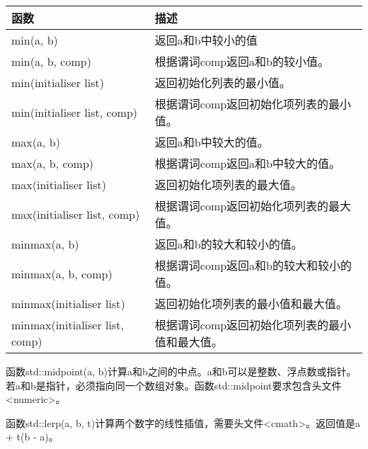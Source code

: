 \begin{longtable}[c]{|l|l|}
\hline
\textbf{函数}           & \textbf{描述}                                                                \\ \hline
\endfirsthead
%
\endhead
%
min(a, b)                   & 返回a和b中较小的值                                                \\ \hline
min(a, b, comp)             & 根据谓词comp返回a和b的较小值。               \\ \hline
min(initialiser list)       & 返回初始化列表的最小值。                                 \\ \hline
min(initialiser list, comp) & 根据谓词comp返回初始化项列表的最小值。 \\ \hline
max(a, b)                   & 返回a和b中较大的值。                                               \\ \hline
max(a, b, comp)             & 根据谓词comp返回a和b中较大的值。               \\ \hline
max(initialiser list)       & 返回初始化项列表的最大值。                                 \\ \hline
max(initialiser list, comp) & 根据谓词comp返回初始化项列表的最大值。 \\ \hline
minmax(a, b)                & 返回a和b的较大和较小的值。                                   \\ \hline
minmax(a, b, comp)          & 根据谓词comp返回a和b的较大和较小的值。   \\ \hline
minmax(initialiser list)    & 返回初始化项列表的最小值和最大值。                \\ \hline
minmax(initialiser list, comp) & 根据谓词comp返回初始化项列表的最小值和最大值。 \\ \hline
\end{longtable}


函数std::midpoint(a, b)计算a和b之间的中点。a和b可以是整数、浮点数或指针。若a和b是指针，必须指向同一个数组对象。函数std::midpoint要求包含头文件<numeric>。

函数std::lerp(a, b, t)计算两个数字的线性插值，需要头文件<cmath>。返回值是a + t(b - a)。



